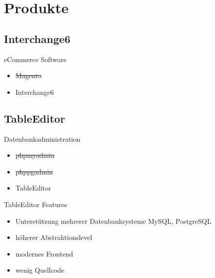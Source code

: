 
\section{Produkte}


\subsection{Interchange6}
\begin{frame}{eCommerce Software}
\begin{itemize}
\item \sout{Magento}
\item Interchange6
\end{itemize}
\end{frame}

\subsection{TableEditor}
\begin{frame}{Datenbankadministration}
\begin{itemize}
\item \sout{phpmyadmin}
\item \sout{phppgadmin}
\item TableEditor
\end{itemize}
\end{frame}

\begin{frame}{TableEditor Features}
\begin{itemize}
\item Unterstützung mehrerer Datenbanksysteme
      MySQL, PostgreSQL
\item höherer Abstraktionslevel
\item modernes Frontend
\item wenig Quellcode
\end{itemize}
\end{frame}

